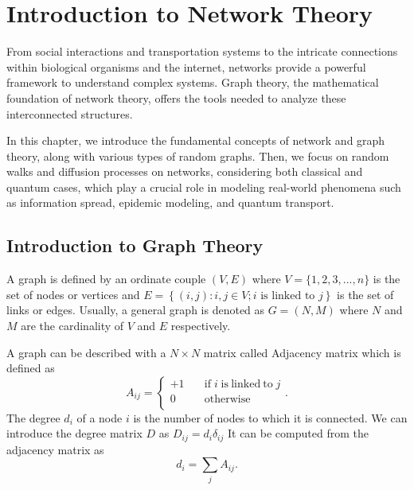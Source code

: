 \chapter{Introduction to Network Theory}\label{Network_Theory}

From social interactions and transportation systems to the intricate connections within biological organisms and the internet, networks provide a powerful framework to understand complex systems. Graph theory, the mathematical foundation of network theory, offers the tools needed to analyze these interconnected structures.

In this chapter, we introduce the fundamental concepts of network and graph theory, along with various types of random graphs.
Then, we focus on random walks and diffusion processes on networks, considering both classical and quantum cases, which play a crucial role in modeling real-world phenomena such as information spread, epidemic modeling, and quantum transport.


\section{Introduction to Graph Theory}


A graph is defined by an ordinate couple $(V,E)$ where $V = \{1,2,3, ...,n\}$ is the set of nodes or vertices and $E = \left\{ (i, j): i , j \in V ; i \text{ is linked to } j\right\}$ is the set of links or edges. Usually, a general graph is denoted as $G =(N,M)$ where $N$ and $M$ are the cardinality of $V$ and $E$ respectively.

A graph can be described with a $N\times N$ matrix called Adjacency matrix which is defined as
\begin{equation}
    A_{ij}= \left\{ \begin{aligned}
        +1 &\quad \mathrm{if} \; i \; \mathrm{is ~linked ~to} \; j \\
        0 &\quad \mathrm{otherwise} \\
    \end{aligned} \right.  .
\end{equation}
The degree $d_i$ of a node $i$ is the number of nodes to which it is connected. We can introduce the degree matrix $D$ as $D_{ij} = d_i\delta_{ij}$
It can be computed from the adjacency matrix as
\begin{equation}
    d_i = \sum_j A_{ij}.
\end{equation}

